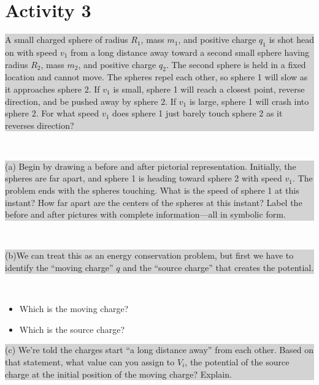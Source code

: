 \documentclass[]{article}
\newcommand{\excerpt}[1]{\colorbox{lightgray}{\parbox{14.8cm}{#1}} \\}
\begin{document}
\section*{Activity 3}%
\excerpt{
A small charged sphere of radius $ R_{1} $, mass $ m_{1} $, and positive charge $ q_{1} $ is shot head on with speed $ v_{1} $ from a long distance away toward a second small sphere having radius $ R_{2} $, mass $ m_{2} $, and positive charge $ q_{2} $. The second sphere is held in a fixed location and cannot move. The spheres repel each other, so sphere 1 will slow as it approaches sphere 2. If $ v_{1} $ is small, sphere 1 will reach a closest point, reverse direction, and be pushed away by sphere 2. If $ v_{1} $ is large, sphere 1 will crash into sphere 2. For what speed $ v_{1} $ does sphere 1 just barely touch sphere 2 as it reverses direction?
}
\excerpt{
(a) Begin by drawing a before and after pictorial representation. Initially, the spheres are far apart, and sphere 1 is heading toward sphere 2 with speed $ v_{1} $. The problem ends with the spheres touching. What is the speed of sphere 1 at this instant? How far apart are the centers of the spheres at this instant? Label the before and after pictures with complete information---all in symbolic form.
}
\excerpt{
(b)We can treat this as an energy conservation problem, but first we have to identify the ``moving charge'' $ q $ and the ``source charge'' that creates the potential.
}
\begin{itemize}
	\item Which is the moving charge? %
	\item Which is the source charge? %
\end{itemize}
\excerpt{
(c) We're told the charges start ``a long distance away'' from each other. Based on that statement, what value can you assign to $ V_{i} $, the potential of the source charge at the initial position of the moving charge? Explain.
}
\end{document}
